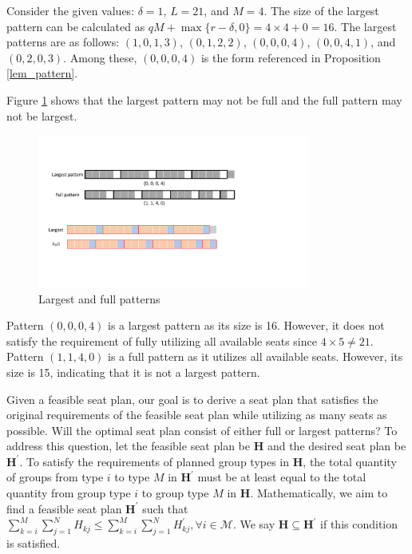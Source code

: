 \begin{example}\label{ex_2}
Consider the given values: $\delta = 1$, $L = 21$, and $M = 4$. The size of the largest pattern can be calculated as $qM + \max\{r-\delta, 0\} = 4 \times 4 + 0 = 16$. The largest patterns are as follows: $(1, 0, 1, 3)$, $(0, 1, 2, 2)$, $(0, 0, 0, 4)$, $(0, 0, 4, 1)$, and $(0, 2, 0, 3)$. Among these, $(0, 0, 0, 4)$ is the form referenced in Proposition \ref{lem_pattern}.

Figure \ref{full_largest} shows that the largest pattern may not be full and the full pattern may not be largest.
\begin{figure}[ht]
    \caption{Largest and full patterns}\label{full_largest}
    \centering
        \includegraphics[width=0.8\textwidth]{./Figures/largest_full.pdf}
\end{figure}

Pattern $(0, 0, 0, 4)$ is a largest pattern as its size is 16. However, it does not satisfy the requirement of fully utilizing all available seats since $4 \times 5 \neq 21$. Pattern $(1, 1, 4, 0)$ is a full pattern as it utilizes all available seats. However, its size is 15, indicating that it is not a largest pattern.
\end{example}


 Given a feasible seat plan, our goal is to derive a seat plan that satisfies the original requirements of the feasible seat plan while utilizing as many seats as possible. Will the optimal seat plan consist of either full or largest patterns? To address this question, let the feasible seat plan be $\bm{H}$ and the desired seat plan be $\bm{H}^{\prime}$. To satisfy the requirements of planned group types in $\bm{H}$, the total quantity of groups from type $i$ to type $M$ in $\bm{H}^{\prime}$ must be at least equal to the total quantity from group type $i$ to group type $M$ in $\bm{H}$. Mathematically, we aim to find a feasible seat plan $\bm{H}^{\prime}$ such that $\sum_{k=i}^{M} \sum_{j=1}^{N} H_{kj} \leq \sum_{k=i}^{M} \sum_{j=1}^{N} H^{\prime}_{kj}, \forall i \in \mathcal{M}$. We say $\bm{H} \subseteq \bm{H}^{\prime}$ if this condition is satisfied.

